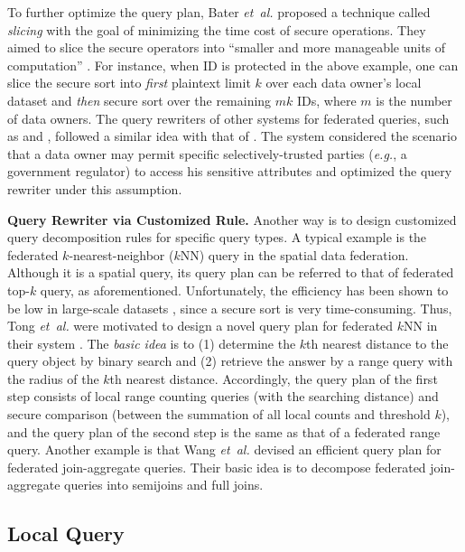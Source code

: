 \documentclass[11pt]{article}
\newcommand{\etal}{\textit{et~al.}\xspace}
\newcommand{\eg}{\textit{e.g.},\xspace}
\newcommand{\fakeparagraph}[1]{\vspace{1mm}\noindent\textbf{#1.}}
\begin{document}
To further optimize the query plan, Bater \etal \cite{Yongxin-ref_bater2017smcql} proposed a technique called \textit{slicing} with the goal of minimizing the time cost of secure operations.
They aimed to slice the secure operators into ``smaller and more manageable units of computation'' \cite{Yongxin-ref_bater2017smcql}.
For instance, when ID is protected in the above example, one can slice the secure sort into \textit{first} plaintext limit $k$ over each data owner's local dataset and \textit{then} secure sort over the remaining $mk$ IDs,
where $m$ is the number of data owners.
The query rewriters of other systems for federated queries, such as \Shrinkwrap \cite{Yongxin-ref_bater2018shrinkwrap} and \SAQE \cite{Yongxin-ref_bater2020saqe}, followed a similar idea with that of \SMCQL.
The system \Conclave \cite{Yongxin-ref_volgushev2019conclave} considered the scenario that a data owner may permit specific selectively-trusted parties (\eg a government regulator) to access his sensitive attributes and optimized the query rewriter under this assumption.

\fakeparagraph{Query Rewriter via Customized Rule}
Another way is to design customized query decomposition rules for specific query types.
A typical example is the federated $k$-nearest-neighbor ($k$NN) query \cite{Yongxin-ref_tong2022hu} in the spatial data federation.
Although it is a spatial query, its query plan can be referred to that of federated top-$k$ query, as aforementioned.
Unfortunately, the efficiency has been shown to be low in large-scale datasets \cite{Yongxin-ref_tong2022hu}, since a secure sort is very time-consuming.
Thus, Tong \etal \cite{Yongxin-ref_tong2022hu} were motivated to design a novel query plan for federated $k$NN in their system \HuFu.
The \textit{basic idea} is to (1) determine the $k$th nearest distance to the query object by binary search and (2) retrieve the answer by a range query with the radius of the $k$th nearest distance.
Accordingly, the query plan of the first step consists of local range counting queries (with the searching distance) and secure comparison (between the summation of all local counts and threshold $k$),
and the query plan of the second step is the same as that of a federated range query.
Another example is that Wang \etal \cite{Yongxin-ref_wang2021secure} devised an efficient query plan for federated join-aggregate queries.
Their basic idea is to decompose federated join-aggregate queries into semijoins and full joins.

\subsection{Local Query}\label{sec:data-local}
\end{document}
